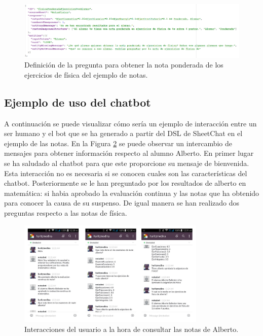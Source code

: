 \begin{figure}[htb]
	\centering
	\includegraphics[width=1\textwidth]{./figs/DSLNotasPonderada.png}
	\caption{Definición de la pregunta para obtener la nota ponderada de los ejercicios de física del ejemplo de notas.}
	\label{fig:DSLNotasPonderada}
\end{figure}

\subsection{Ejemplo de uso del chatbot}

A continuación se puede visualizar cómo sería un ejemplo de interacción entre un ser humano y el bot que se ha generado a partir del DSL de SheetChat en el ejemplo de las notas. En la Figura \ref{fig:EjecucionNotas1} se puede observar un intercambio de mensajes para obtener información respecto al alumno Alberto. En primer lugar se ha saludado al chatbot para que este proporcione su mensaje de bienvenida. Esta interacción no es necesaria si se conocen cuales son las características del chatbot. Posteriormente se le han preguntado por los resultados de alberto en matemática: si habia aprobado la evaluación continua y las notas que ha obtenido para conocer la causa de su suspenso. De igual manera se han realizado dos preguntas respecto a las notas de física.

\begin{figure}[htb]
	\centering
	\includegraphics[width=0.8\textwidth]{./figs/ejecucionNotas1.png}
	\caption{Interacciones del usuario a la hora de consultar las notas de Alberto.}
	\label{fig:EjecucionNotas1}
\end{figure}

